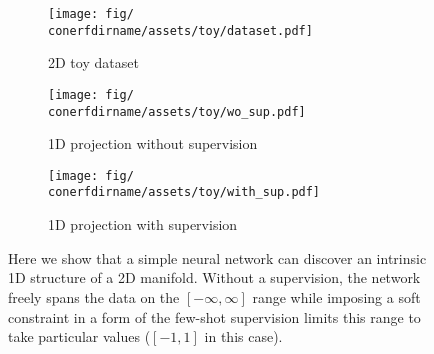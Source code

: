 \begin{figure}[!tbhp]
  \centering
  \begin{subfigure}[b]{.48\columnwidth}
    \centering
    \texttt{[image: fig/\\conerfdirname/assets/toy/dataset.pdf]}
    \caption{2D toy dataset}
    \label{subfig:conerf-2d-dataset}
  \end{subfigure}
  \hfill{}
  \begin{subfigure}[b]{.48\columnwidth}
    \centering
    \texttt{[image: fig/\\conerfdirname/assets/toy/wo\_sup.pdf]}
    \vspace{.1em}
    \caption{1D projection without supervision}
    \label{subfig:conerf-without-sup}

    \centering
    \texttt{[image: fig/\\conerfdirname/assets/toy/with\_sup.pdf]}
    \vspace{.1em}
    \caption{1D projection with supervision}
    \label{subfig:conerf-with-sup}
  \end{subfigure}
  \caption{Here we show that a simple neural network can discover an intrinsic 1D structure of a 2D manifold.
    Without a supervision, the network freely spans the data on the $[-\infty,
    \infty]$ range while imposing a soft constraint in a form of the few-shot
    supervision limits this range to take particular values ($[-1, 1]$ in this
    case).
  }
  \label{fig:toy-span}
\end{figure}
